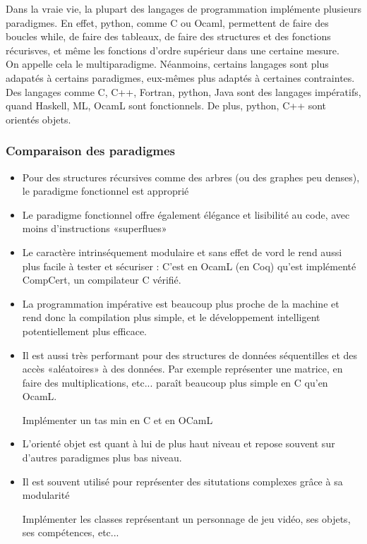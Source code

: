 	Dans la vraie vie, la plupart des langages de programmation implémente plusieurs paradigmes. En effet, python, comme C ou Ocaml, permettent de faire des boucles while, de faire des tableaux, de faire des structures et des fonctions récurisves, et même les fonctions d'ordre supérieur dans une certaine mesure.\\
	
	On appelle cela le multiparadigme. Néanmoins, certains langages sont plus adapatés à certains paradigmes, eux-mêmes plus adaptés à certaines contraintes.\\
	
	Des langages comme C, C++, Fortran, python, Java sont des langages impératifs, quand Haskell, ML, OcamL sont fonctionnels. De plus, python, C++ sont orientés objets.

\subsubsection{Comparaison des paradigmes}
	\begin{itemize}[label=$\star$]
		\item Pour des structures récursives comme des arbres (ou des graphes peu denses), le paradigme fonctionnel est approprié
		\item Le paradigme fonctionnel offre également élégance et lisibilité au code, avec moins d'instructions «superflues»
		\item Le caractère intrinséquement modulaire et sans effet de vord le rend aussi plus facile à tester et sécuriser : C'est en OcamL (en Coq) qu'est implémenté CompCert, un compilateur C vérifié.
		\item La programmation impérative est beaucoup plus proche de la machine et rend donc la compilation plus simple, et le développement intelligent potentiellement plus efficace.
		\item Il est aussi très performant pour des structures de données séquentilles et des accès «aléatoires» à des données. Par exemple représenter une matrice, en faire des multiplications, etc... paraît beaucoup plus simple en C qu'en OcamL.
		\begin{exercise}
			Implémenter un tas min en C et en OCamL
		\end{exercise}
		\item L'orienté objet est quant à lui de plus haut niveau et repose souvent sur d'autres paradigmes plus bas niveau.
		\item Il est souvent utilisé pour représenter des situtations complexes grâce à sa modularité
		\begin{exercise}
			Implémenter les classes représentant un personnage de jeu vidéo, ses objets, ses compétences, etc...
		\end{exercise}
	\end{itemize}

